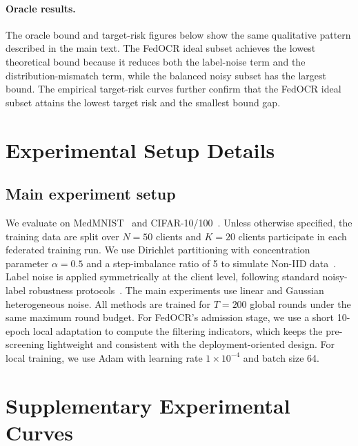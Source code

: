 \paragraph{\textbf{Oracle results.}}
The oracle bound and target-risk figures below show the same qualitative pattern described in the main text.
The FedOCR ideal subset achieves the lowest theoretical bound because it reduces both the label-noise term and the distribution-mismatch term, while the balanced noisy subset has the largest bound.
The empirical target-risk curves further confirm that the FedOCR ideal subset attains the lowest target risk and the smallest bound gap.

\section{Experimental Setup Details}
\label{app:experiment_setup_details}
\subsection{Main experiment setup}
\label{app:main_experiment_setup}
We evaluate on MedMNIST~\cite{yang2023medmnist} and CIFAR-10/100~\cite{krizhevsky2009learning}.
Unless otherwise specified, the training data are split over $N=50$ clients and $K=20$ clients participate in each federated training run.
We use Dirichlet partitioning with concentration parameter $\alpha=0.5$ and a step-imbalance ratio of 5 to simulate Non-IID data~\cite{hsu2019measuring,li2021silos,zhu2021survey}.
Label noise is applied symmetrically at the client level, following standard noisy-label robustness protocols~\cite{natarajan2013learning,patrini2017loss,liang2023fednoisy}.
The main experiments use linear and Gaussian heterogeneous noise.
All methods are trained for $T=200$ global rounds under the same maximum round budget.
For FedOCR's admission stage, we use a short 10-epoch local adaptation to compute the filtering indicators, which keeps the pre-screening lightweight and consistent with the deployment-oriented design.
For local training, we use Adam with learning rate $1\times10^{-4}$ and batch size 64.



\section{Supplementary Experimental Curves}
\label{app:more_curves}

